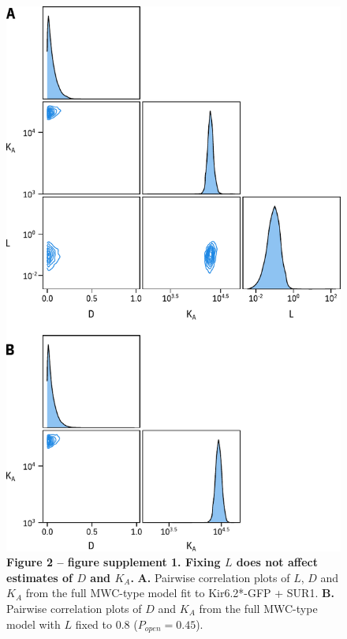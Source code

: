 \documentclass[10pt,lineno, doublespacing]{elife}
\begin{document}
\begin{figure}
\begin{fullwidth}
\centering
\includegraphics[height=0.88\textheight]{figure_two_s1}
\captionsetup{labelformat=empty}
\caption{
\textbf{Figure 2 -- figure supplement 1. Fixing $L$ does not affect estimates of $D$ and $K_A$.}
\textbf{A.}
Pairwise correlation plots of $L$, $D$ and $K_A$ from the full MWC-type model fit to Kir6.2*-GFP + SUR1.
\textbf{B.}
Pairwise correlation plots of $D$ and $K_A$ from the full MWC-type model with $L$ fixed to 0.8 ($P_{open} = 0.45$).
}
\label{fig:two_s1}
\end{fullwidth}
\end{figure}
\end{document}
